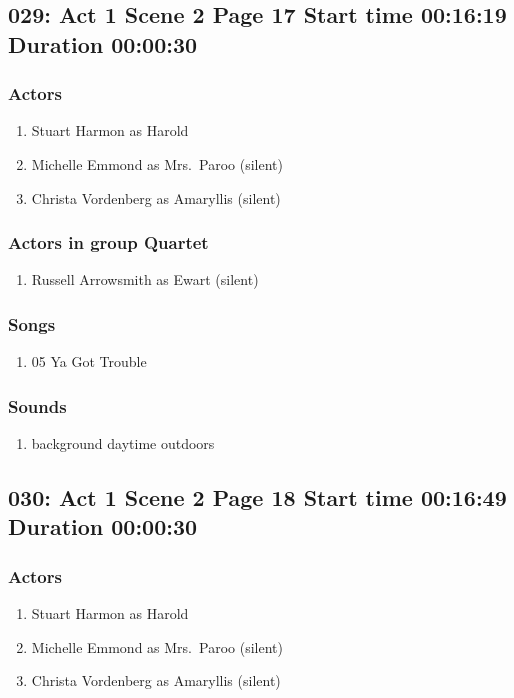 \subsection{029: Act 1 Scene 2 Page 17 Start time 00:16:19 Duration 00:00:30}

\subsubsection{Actors}
\begin{enumerate}
\item Stuart Harmon as Harold
\item Michelle Emmond as Mrs.~Paroo (silent)
\item Christa Vordenberg as Amaryllis (silent)
\end{enumerate}
\subsubsection{Actors in group Quartet}
\begin{enumerate}
\item Russell Arrowsmith as Ewart (silent)
\end{enumerate}

\subsubsection{Songs}
\begin{enumerate}
\item 05 Ya Got Trouble
\end{enumerate}\subsubsection{Sounds}
\begin{enumerate}
\item background daytime outdoors
\end{enumerate}
\subsection{030: Act 1 Scene 2 Page 18 Start time 00:16:49 Duration 00:00:30}

\subsubsection{Actors}
\begin{enumerate}
\item Stuart Harmon as Harold
\item Michelle Emmond as Mrs.~Paroo (silent)
\item Christa Vordenberg as Amaryllis (silent)
\end{enumerate}

